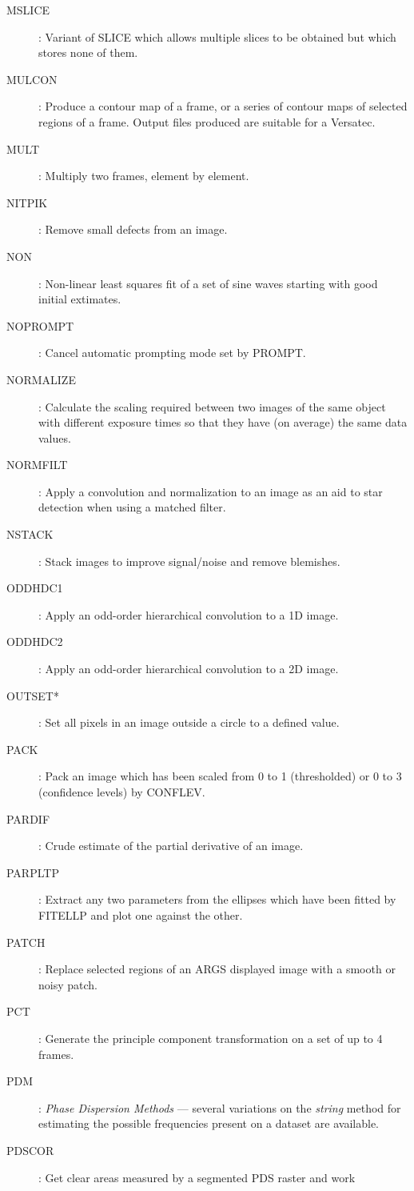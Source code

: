 \begin{description}
\item [MSLICE]: Variant of SLICE which allows multiple slices to be obtained 
but which stores none of them.
\item [MULCON]: Produce a contour map of a frame, or a series of contour maps
of selected regions of a frame.
Output files produced are suitable for a Versatec.
\item [MULT]: Multiply two frames, element by element.
\item [NITPIK]: Remove small defects from an image.
\item [NON]: Non-linear least squares fit of a set of sine waves starting with
good initial extimates.
\item [NOPROMPT]: Cancel automatic prompting mode set by PROMPT.
\item [NORMALIZE]: Calculate the scaling required between two images of the
same object with different exposure times so that they have (on average) the
same data values.
\item [NORMFILT]: Apply a convolution and normalization to an image as an aid to
star detection when using a matched filter.
\item [NSTACK]: Stack images to improve signal/noise and remove blemishes.
\item [ODDHDC1]: Apply an odd-order hierarchical convolution to a 1D image.
\item [ODDHDC2]: Apply an odd-order hierarchical convolution to a 2D image.
\item [OUTSET*]: Set all pixels in an image outside a circle to a defined value.
\item [PACK]: Pack an image which has been scaled from 0 to 1 (thresholded) or
0 to 3 (confidence levels) by CONFLEV.
\item [PARDIF]: Crude estimate of the partial derivative of an image.
\item [PARPLTP]: Extract any two parameters from the ellipses which have been
fitted by FITELLP and plot one against the other.
\item [PATCH]: Replace selected regions of an ARGS displayed image with a
smooth or noisy patch.
\item [PCT]: Generate the principle component transformation on a set of up to 4
frames.
\item [PDM]: {\em Phase Dispersion Methods} --- several variations on the
{\em string} method for estimating the possible frequencies present on a
dataset are available.
\item [PDSCOR]: Get clear areas measured by a segmented PDS raster and work

\end{description}
